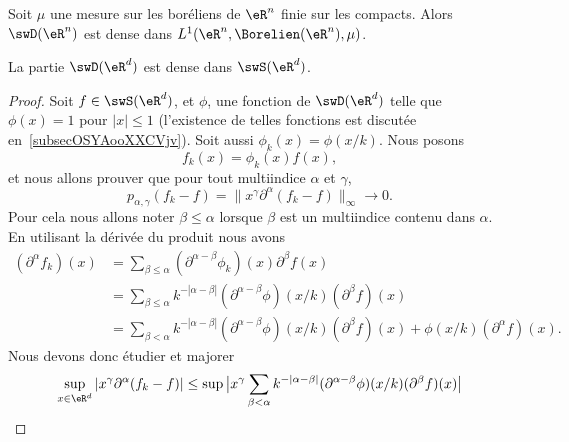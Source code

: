 \begin{theorem}      \label{ThoRWEoqY}
	Soit \( \mu\) une mesure sur les boréliens de \( \eR^n\) finie sur les compacts. Alors \( \swD(\eR^n)\) est dense dans \( L^1(\eR^n,\Borelien(\eR^n),\mu)\).
\end{theorem}

\begin{proposition}      \label{PROPooJNQZooIRbJei}
	La partie \( \swD(\eR^d)\) est dense dans \( \swS(\eR^d)\).
\end{proposition}

\begin{proof}
	Soit \( f\in \swS(\eR^d)\), et \( \phi\), une fonction de \( \swD(\eR^d)\) telle que \( \phi(x)=1\) pour \(| x |\leq 1 \) (l'existence de telles fonctions est discutée en~\ref{subsecOSYAooXXCVjv}). Soit aussi \( \phi_k(x)=\phi(x/k)\). Nous posons
	\begin{equation}
		f_k(x)=\phi_k(x)f(x),
	\end{equation}
	et nous allons prouver que pour tout multiindice \( \alpha\) et \( \gamma\),
	\begin{equation}
		p_{\alpha,\gamma}(f_k-f)=\| x^{\gamma}\partial^{\alpha}(f_k-f)  \|_{\infty}\to 0.
	\end{equation}
	Pour cela nous allons noter \(  \beta\leq \alpha  \) lorsque \( \beta\) est un multiindice contenu dans \( \alpha\). En utilisant la dérivée du produit nous avons
	\begin{subequations}
		\begin{align}
			(\partial^{\alpha}f_k)(x) & =\sum_{\beta\leq \alpha}(\partial^{\alpha-\beta}\phi_k)(x)\partial^{\beta}f(x)                                                         \\
			                          & =\sum_{\beta\leq \alpha}k^{-| \alpha-\beta |}(\partial^{\alpha-\beta}\phi)(x/k)(\partial^{\beta}f)(x)                                  \\
			                          & =\sum_{\beta< \alpha}k^{-| \alpha-\beta |}(\partial^{\alpha-\beta}\phi)(x/k)(\partial^{\beta}f)(x) + \phi(x/k)(\partial^{\alpha}f)(x).
		\end{align}
	\end{subequations}
	Nous devons donc étudier et majorer
	\begin{equation}
		\begin{aligned}[]
			\sup_{x\in \eR^d}| x^{\gamma}\partial^{\alpha}(f_k-f) | & \leq \sup\big| x^{\gamma}  \sum_{\beta< \alpha}k^{-| \alpha-\beta |}(\partial^{\alpha-\beta}\phi)(x/k)(\partial^{\beta}f)(x)  \big| \\

\end{aligned}
\end{equation}
\end{proof}
